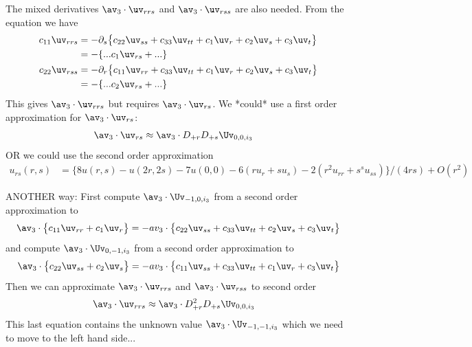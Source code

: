\documentclass[10pt]{article}
\begin{document}
The mixed derivatives $\av_3\cdot\uv_{rrs}$ and $\av_3\cdot\uv_{rss}$ are also needed.
From the equation we have
\begin{align}
    c_{11} \uv_{rrs} & = - \partial_s\big\{ c_{22} \uv_{ss} + c_{33} \uv_{tt} 
                       + c_{1} \uv_{r} + c_{2} \uv_{s} + c_{3} \uv_{t} \big\} \\
                     &= -\{ ... c_{1} \uv_{rs} + ... \} \\
  c_{22} \uv_{rss} &  = - \partial_r\big\{ c_{11} \uv_{rr} + c_{33} \uv_{tt} 
                       + c_{1} \uv_{r} + c_{2} \uv_{s} + c_{3} \uv_{t} \big\} \\
                     &= -\{ ... c_{2} \uv_{rs} + ... \} \\
\end{align}
This gives $\av_3\cdot\uv_{rrs}$ but requires $\av_3\cdot\uv_{rs}$.
We *could* use a first order approximation for $\av_3\cdot\uv_{rs}$:
\begin{align}
  \av_3\cdot\uv_{rs} &\approx \av_3\cdot D_{+r}D_{+s} \Uv_{0,0,i_3}
\end{align}
OR we could use the second order approximation
\begin{align*}
  u_{rs}(r,s) &= \big\{ 8 u(r,s) - u(2r,2s) - 7 u(0,0) - 6( ru_r+ su_s) -2( r^2 u_{rr} + s^s u_{ss} )
                     \big\} /(4 r s) + O( r^2 )
\end{align*}



ANOTHER way: First compute $\av_3\cdot\Uv_{-1,0,i_3}$ from a second order
approximation to
\begin{align}
  \av_3\cdot\big\{ c_{11} \uv_{rr} + c_1 \uv_r\big\}  &= - av_3\cdot\big\{ c_{22} \uv_{ss} + c_{33} \uv_{tt} 
                        + c_{2} \uv_{s} + c_{3} \uv_{t} \big\} \\
\end{align}
and compute $\av_3\cdot\Uv_{0,-1,i_3}$ from a second order
approximation to
\begin{align}
  \av_3\cdot\big\{ c_{22} \uv_{ss} + c_2 \uv_s\big\}  &= - av_3\cdot\big\{ c_{11} \uv_{ss} + c_{33} \uv_{tt} 
                       + c_{1} \uv_{r}  + c_{3} \uv_{t} \big\} \\
\end{align}
Then we can approximate $\av_3\cdot\uv_{rrs}$ and $\av_3\cdot\uv_{rss}$ to second order
\begin{align}
   \av_3\cdot\uv_{rrs} &\approx \av_3\cdot D_{+r}^2D_{+s} \Uv_{0,0,i_3}
\end{align}
This last equation contains the unknown value $\av_3\cdot\Uv_{-1,-1,i_3}$ which we need to move to
the left hand side...
\end{document}
